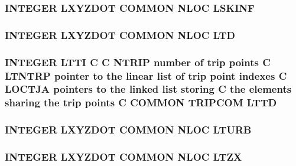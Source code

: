 \hypertarget{nloc_8com_ad5faaed758e745105721a25f6ff65e36}{
\subsubsection[{L\-S\-K\-I\-N\-F}]{\setlength{\rightskip}{0pt plus 5cm}I\-N\-T\-E\-G\-E\-R L\-X\-Y\-Z\-D\-O\-T C\-O\-M\-M\-O\-N N\-L\-O\-C L\-S\-K\-I\-N\-F}}\label{nloc_8com_ad5faaed758e745105721a25f6ff65e36}
\hypertarget{nloc_8com_a0b1f5dbbdc62804ec5dc66af1e132a37}{
\subsubsection[{L\-T\-D}]{\setlength{\rightskip}{0pt plus 5cm}I\-N\-T\-E\-G\-E\-R L\-X\-Y\-Z\-D\-O\-T C\-O\-M\-M\-O\-N N\-L\-O\-C L\-T\-D}}\label{nloc_8com_a0b1f5dbbdc62804ec5dc66af1e132a37}
\hypertarget{nloc_8com_a0d4fc998108c0f869ce087a3b54bdca6}{
\subsubsection[{L\-T\-T\-D}]{\setlength{\rightskip}{0pt plus 5cm}I\-N\-T\-E\-G\-E\-R L\-T\-T\-I C C {\bf N\-T\-R\-I\-P} number of trip points C L\-T\-N\-T\-R\-P pointer to the linear list of trip point indexes C {\bf L\-O\-C\-T\-J\-A} pointers to the linked list storing C the elements sharing the trip points C C\-O\-M\-M\-O\-N T\-R\-I\-P\-C\-O\-M L\-T\-T\-D}}\label{nloc_8com_a0d4fc998108c0f869ce087a3b54bdca6}
\hypertarget{nloc_8com_ac0bae9360ed1ee49132a1100fd133e47}{
\subsubsection[{L\-T\-U\-R\-B}]{\setlength{\rightskip}{0pt plus 5cm}I\-N\-T\-E\-G\-E\-R L\-X\-Y\-Z\-D\-O\-T C\-O\-M\-M\-O\-N N\-L\-O\-C L\-T\-U\-R\-B}}\label{nloc_8com_ac0bae9360ed1ee49132a1100fd133e47}
\hypertarget{nloc_8com_a537c58a1ee889969543d80d603f7a358}{
\subsubsection[{L\-T\-Z\-X}]{\setlength{\rightskip}{0pt plus 5cm}I\-N\-T\-E\-G\-E\-R L\-X\-Y\-Z\-D\-O\-T C\-O\-M\-M\-O\-N N\-L\-O\-C L\-T\-Z\-X}}\label{nloc_8com_a537c58a1ee889969543d80d603f7a358}
